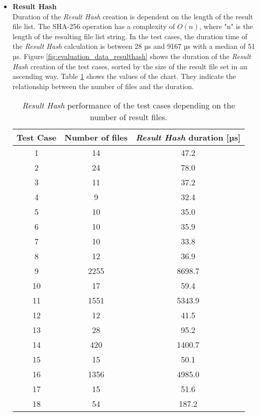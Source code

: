 \documentclass[draft,final]{vutinfth} %
\begin{document}
\begin{itemize}
	\item \textbf{Result Hash} \\
	Duration of the \textit{Result Hash} creation is dependent on the length of the result file list. The SHA-256 operation has a complexity of $O(n)$, where "n" is the length of the resulting file list string. In the test cases, the duration time of the \textit{Result Hash} calculation is between 28 µs and 9167 µs with a median of 51 µs. Figure \ref{fig:evaluation_data_resulthash} shows the duration of the \textit{Result Hash} creation of the test cases, sorted by the size of the result file set in an ascending way. Table \ref{Tab:data_result_hash} shows the values of the chart. They indicate the relationship between the number of files and the duration.  
	
	\begin{table}[]
		\caption{\textit{Result Hash} performance of the test cases depending on the number of result files.}
		
		\centering
		\begin{tabular}{c|c|c}
			\textbf{Test Case} & \textbf{Number of files} & \textbf{\textit{Result Hash} duration [µs]}  \\ \hline
			1 & 14  & 47.2 \\ \hline 
			2 & 24 & 78.0 \\ \hline
			3 & 11 & 37.2 \\ \hline
			4 & 9 & 32.4 \\ \hline
			5 & 10 & 35.0 \\ \hline
			6 & 10 & 35.9 \\ \hline
			7 & 10 & 33.8 \\ \hline
			8 & 12 & 36.9 \\ \hline
			9 & 2255 & 8698.7 \\ \hline
			10 & 17 & 59.4 \\ \hline
			11 & 1551 & 5343.9 \\ \hline
			12 & 12 & 41.5 \\ \hline
			13 & 28 & 95.2 \\ \hline
			14 & 420 & 1400.7 \\ \hline
			15 & 15 & 50.1 \\ \hline
			16 & 1356 & 4985.0 \\ \hline
			17 & 15 & 51.6 \\ \hline
			18 & 54 & 187.2 \\ 
		\end{tabular}
		\label{Tab:data_result_hash}
	\end{table}
	

\end{itemize}
\end{document}
